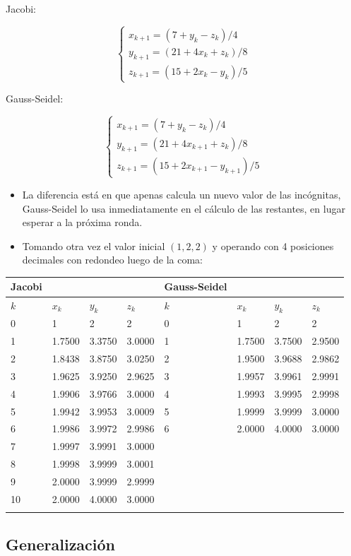 \documentclass[]{book}
\begin{document}
Jacobi:

\[
\begin{cases} 
x_{k+1}=(7+y_k-z_k)/4 \\
y_{k+1}=(21+4x_k+z_k)/8 \\
z_{k+1}=(15+2x_k-y_k)/5
\end{cases}
\]

Gauss-Seidel:

\[
\begin{cases} 
x_{k+1}=(7+y_k-z_k)/4 \\
y_{k+1}=(21+4x_{k+1}+z_k)/8 \\
z_{k+1}=(15+2x_{k+1}-y_{k+1})/5
\end{cases}
\]

\begin{itemize}
\item
  La diferencia está en que apenas calcula un nuevo valor de las incógnitas, Gauss-Seidel lo usa inmediatamente en el cálculo de las restantes, en lugar esperar a la próxima ronda.
\item
  Tomando otra vez el valor inicial \((1, 2, 2)\) y operando con 4 posiciones decimales con redondeo luego de la coma:
\end{itemize}

\begin{longtable}[]{@{}llllllll@{}}
\toprule
\textbf{Jacobi} & & & & \textbf{Gauss-Seidel} & & &\tabularnewline
\midrule
\endhead
\(k\) & \(x_k\) & \(y_k\) & \(z_k\) & \(k\) & \(x_k\) & \(y_k\) & \(z_k\)\tabularnewline
0 & 1 & 2 & 2 & 0 & 1 & 2 & 2\tabularnewline
1 & 1.7500 & 3.3750 & 3.0000 & 1 & 1.7500 & 3.7500 & 2.9500\tabularnewline
2 & 1.8438 & 3.8750 & 3.0250 & 2 & 1.9500 & 3.9688 & 2.9862\tabularnewline
3 & 1.9625 & 3.9250 & 2.9625 & 3 & 1.9957 & 3.9961 & 2.9991\tabularnewline
4 & 1.9906 & 3.9766 & 3.0000 & 4 & 1.9993 & 3.9995 & 2.9998\tabularnewline
5 & 1.9942 & 3.9953 & 3.0009 & 5 & 1.9999 & 3.9999 & 3.0000\tabularnewline
6 & 1.9986 & 3.9972 & 2.9986 & 6 & 2.0000 & 4.0000 & 3.0000\tabularnewline
7 & 1.9997 & 3.9991 & 3.0000 & & & &\tabularnewline
8 & 1.9998 & 3.9999 & 3.0001 & & & &\tabularnewline
9 & 2.0000 & 3.9999 & 2.9999 & & & &\tabularnewline
10 & 2.0000 & 4.0000 & 3.0000 & & & &\tabularnewline
& & & & & & &\tabularnewline
\bottomrule
\end{longtable}

\hypertarget{generalizaciuxf3n}{%
\subsection{Generalización}\label{generalizaciuxf3n}}
\end{document}
